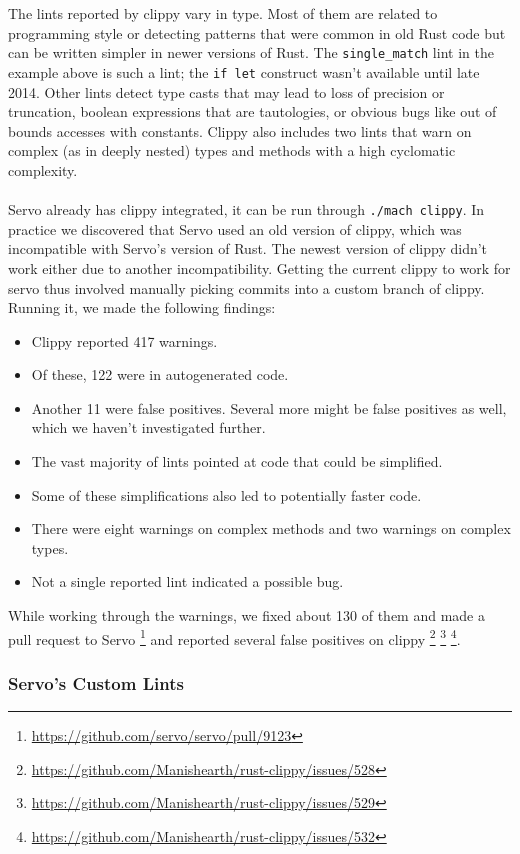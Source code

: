 \documentclass{scrartcl}
\begin{document}
The lints reported by clippy vary in type. Most of them are related to programming style or detecting patterns that were common in old Rust code but can be written simpler in newer versions of Rust. The \texttt{single\_match} lint in the example above is such a lint; the \texttt{if let} construct wasn't available until late 2014. Other lints detect type casts that may lead to loss of precision or truncation, boolean expressions that are tautologies, or obvious bugs like out of bounds accesses with constants. Clippy also includes two lints that warn on complex (as in deeply nested) types and methods with a high cyclomatic complexity.\\
\\
Servo already has clippy integrated, it can be run through \texttt{./mach clippy}. In practice we discovered that Servo used an old version of clippy, which was incompatible with Servo's version of Rust. The newest version of clippy didn't work either due to another incompatibility. Getting the current clippy to work for servo thus involved manually picking commits into a custom branch of clippy. Running it, we made the following findings: 
\begin{itemize}
	\item Clippy reported 417 warnings.
    \item Of these, 122 were in autogenerated code.
    \item Another 11 were false positives. Several more might be false positives as well, which we haven't investigated further.
    \item The vast majority of lints pointed at code that could be simplified.
    \item Some of these simplifications also led to potentially faster code.
    \item There were eight warnings on complex methods and two warnings on complex types.
    \item Not a single reported lint indicated a possible bug.
\end{itemize}

While working through the warnings, we fixed about 130 of them and made a pull request to Servo \footnote{\url{https://github.com/servo/servo/pull/9123}} and reported several false positives on clippy \footnote{\url{https://github.com/Manishearth/rust-clippy/issues/528}} \footnote{\url{https://github.com/Manishearth/rust-clippy/issues/529}} \footnote{\url{https://github.com/Manishearth/rust-clippy/issues/532}}.


\subsubsection{Servo's Custom Lints}
\end{document}
